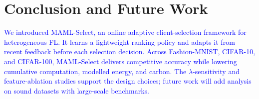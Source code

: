 \documentclass[journal]{IEEEtran}
\newcommand{\revision}[1]{\textcolor{blue}{#1}}
\begin{document}
\FloatBarrier
\section{Conclusion and Future Work}
\revision{We introduced MAML-Select, an online adaptive client-selection framework for heterogeneous FL. It learns a lightweight ranking policy and adapts it from recent feedback before each selection decision. Across Fashion-MNIST, CIFAR-10, and CIFAR-100, MAML-Select delivers competitive accuracy while lowering cumulative computation, modelled energy, and carbon. The $\lambda$-sensitivity and feature-ablation studies support the design choices; future work will add analysis on sound datasets with large-scale benchmarks.}

\vspace{-1mm}
{\scriptsize


}
\end{document}
